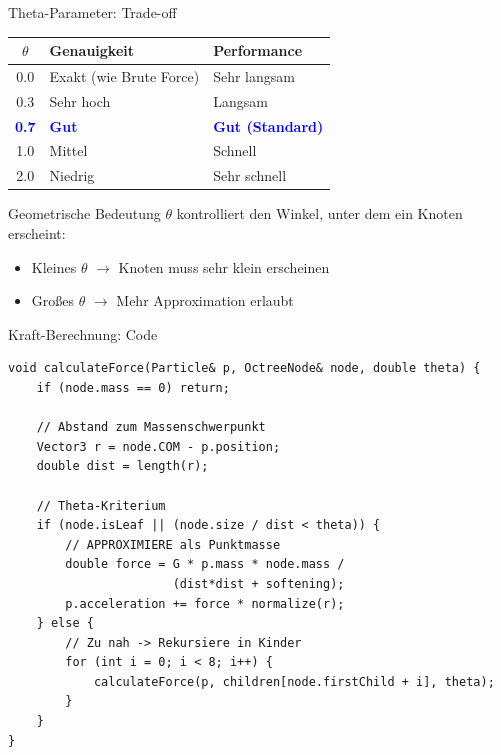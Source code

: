\documentclass[xcolor=dvipsnames]{beamer}
\begin{document}
\begin{frame}{Theta-Parameter: Trade-off}
\begin{table}
\centering
\begin{tabular}{c|l|l}
\textbf{$\theta$} & \textbf{Genauigkeit} & \textbf{Performance} \\ \hline
0.0 & Exakt (wie Brute Force) & Sehr langsam \\
0.3 & Sehr hoch & Langsam \\
\textcolor{blue}{\textbf{0.7}} & \textcolor{blue}{\textbf{Gut}} & \textcolor{blue}{\textbf{Gut (Standard)}} \\
1.0 & Mittel & Schnell \\
2.0 & Niedrig & Sehr schnell
\end{tabular}
\end{table}

\begin{alertblock}{Geometrische Bedeutung}
$\theta$ kontrolliert den Winkel, unter dem ein Knoten erscheint:
\begin{itemize}
    \item Kleines $\theta$ $\rightarrow$ Knoten muss sehr klein erscheinen
    \item Großes $\theta$ $\rightarrow$ Mehr Approximation erlaubt
\end{itemize}
\end{alertblock}
\end{frame}

\begin{frame}[fragile]{Kraft-Berechnung: Code}
\begin{lstlisting}[basicstyle=\tiny\ttfamily]
void calculateForce(Particle& p, OctreeNode& node, double theta) {
    if (node.mass == 0) return;

    // Abstand zum Massenschwerpunkt
    Vector3 r = node.COM - p.position;
    double dist = length(r);

    // Theta-Kriterium
    if (node.isLeaf || (node.size / dist < theta)) {
        // APPROXIMIERE als Punktmasse
        double force = G * p.mass * node.mass /
                       (dist*dist + softening);
        p.acceleration += force * normalize(r);
    } else {
        // Zu nah -> Rekursiere in Kinder
        for (int i = 0; i < 8; i++) {
            calculateForce(p, children[node.firstChild + i], theta);
        }
    }
}
\end{lstlisting}
\end{frame}
\end{document}
